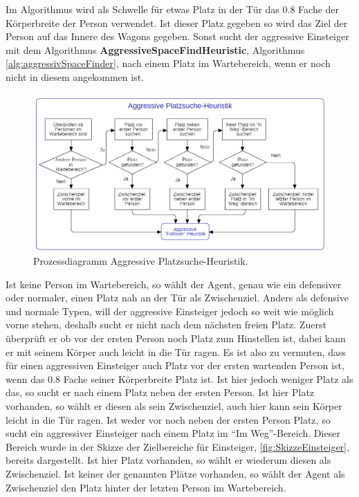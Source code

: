 Im Algorithmus wird als Schwelle für etwas Platz in der Tür das 0.8 Fache der Körperbreite der Person verwendet. Ist dieser Platz gegeben so wird das Ziel der Person auf das Innere des Wagons gegeben. Sonst sucht der aggressive Einsteiger mit dem Algorithmus \textbf{AggressiveSpaceFindHeuristic}, Algorithmus \ref{alg:aggressivSpaceFinder}, nach einem Platz im Wartebereich, wenn er noch nicht in diesem angekommen ist.

\begin{figure}[H]
	\centering
		\includegraphics[width=1.0\textwidth]{pictures/model/algorithm/boarding/aggressive_boarding/aggressive_space_find_heuristic.png}
	\caption{Prozessdiagramm Aggressive Platzsuche-Heuristik.}
	\label{fig:APH}
\end{figure}
Ist keine Person im Wartebereich, so wählt der Agent, genau wie ein defensiver oder normaler, einen Platz nah an der Tür als Zwischenziel. Anders als defensive und normale Typen, will der aggressive Einsteiger jedoch so weit wie möglich vorne stehen, deshalb sucht er nicht nach dem nächsten freien Platz. Zuerst überprüft er ob vor der ersten Person noch Platz zum Hinstellen ist, dabei kann er mit seinem Körper auch leicht in die Tür ragen. Es ist also zu vermuten, dass für einen aggressiven Einsteiger auch Platz vor der ersten wartenden Person ist, wenn das  0.8 Fache seiner Körperbreite Platz ist. Ist hier jedoch weniger Platz als das, so sucht er nach einem Platz neben der ersten Person. Ist hier Platz vorhanden, so wählt er diesen als sein Zwischenziel, auch hier kann sein Körper leicht in die Tür ragen. Ist weder vor noch neben der ersten Person Platz, so sucht ein aggressiver Einsteiger nach einem Platz im "`Im Weg"'-Bereich. Dieser Bereich wurde in der Skizze der Zielbereiche für Einsteiger, \figurename \ref{fig:SkizzeEinsteiger}, bereits dargestellt. Ist hier Platz vorhanden, so wählt er wiederum diesen als Zwischenziel. Ist keiner der genannten Plätze vorhanden, so wählt der Agent als Zwischenziel den Platz hinter der letzten Person im Wartebereich. 

